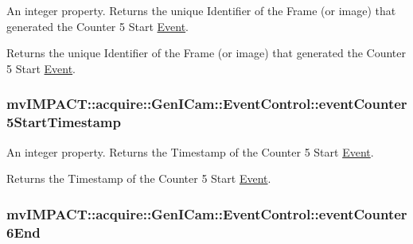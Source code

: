 An integer property. Returns the unique Identifier of the Frame (or image) that generated the Counter 5 Start \hyperlink{classmv_i_m_p_a_c_t_1_1acquire_1_1_event}{Event}. 

Returns the unique Identifier of the Frame (or image) that generated the Counter 5 Start \hyperlink{classmv_i_m_p_a_c_t_1_1acquire_1_1_event}{Event}. \hypertarget{classmv_i_m_p_a_c_t_1_1acquire_1_1_gen_i_cam_1_1_event_control_a7e2c9af8cf6457d7529be46105df3a00}{
\subsubsection[{event\+Counter5\+Start\+Timestamp}]{ mv\+I\+M\+P\+A\+C\+T\+::acquire\+::\+Gen\+I\+Cam\+::\+Event\+Control\+::event\+Counter5\+Start\+Timestamp}}\label{classmv_i_m_p_a_c_t_1_1acquire_1_1_gen_i_cam_1_1_event_control_a7e2c9af8cf6457d7529be46105df3a00}


An integer property. Returns the Timestamp of the Counter 5 Start \hyperlink{classmv_i_m_p_a_c_t_1_1acquire_1_1_event}{Event}. 

Returns the Timestamp of the Counter 5 Start \hyperlink{classmv_i_m_p_a_c_t_1_1acquire_1_1_event}{Event}. \hypertarget{classmv_i_m_p_a_c_t_1_1acquire_1_1_gen_i_cam_1_1_event_control_a42b5e147e9269213e49f2d28ab30b254}{
\subsubsection[{event\+Counter6\+End}]{ mv\+I\+M\+P\+A\+C\+T\+::acquire\+::\+Gen\+I\+Cam\+::\+Event\+Control\+::event\+Counter6\+End}}\label{classmv_i_m_p_a_c_t_1_1acquire_1_1_gen_i_cam_1_1_event_control_a42b5e147e9269213e49f2d28ab30b254}


